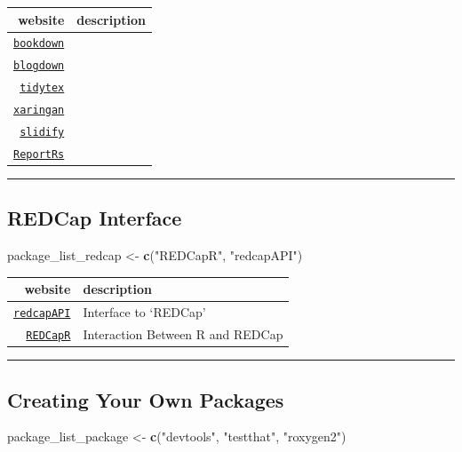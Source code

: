 \documentclass[]{book}
\newenvironment{Shaded}{\begin{snugshade}}{\end{snugshade}}
\newcommand{\KeywordTok}[1]{\textcolor[rgb]{0.13,0.29,0.53}{\textbf{#1}}}
\newcommand{\StringTok}[1]{\textcolor[rgb]{0.31,0.60,0.02}{#1}}
\newcommand{\NormalTok}[1]{#1}
\theoremstyle{definition}
\theoremstyle{definition}
\theoremstyle{definition}
\theoremstyle{remark}
\begin{document}
\begin{longtable}[]{@{}rl@{}}
\toprule
website & description\tabularnewline
\midrule
\endhead
\href{}{\texttt{bookdown}} &\tabularnewline
\href{}{\texttt{blogdown}} &\tabularnewline
\href{}{\texttt{tidytex}} &\tabularnewline
\href{}{\texttt{xaringan}} &\tabularnewline
\href{}{\texttt{slidify}} &\tabularnewline
\href{}{\texttt{ReportRs}} &\tabularnewline
\bottomrule
\end{longtable}

\begin{center}\rule{0.5\linewidth}{\linethickness}\end{center}

\subsection{REDCap Interface}\label{redcap-interface}

\begin{Shaded}
\begin{Highlighting}[]
\NormalTok{package_list_redcap <-}\StringTok{ }\KeywordTok{c}\NormalTok{(}\StringTok{"REDCapR"}\NormalTok{,}
                         \StringTok{"redcapAPI"}\NormalTok{)}
\end{Highlighting}
\end{Shaded}

\begin{longtable}[]{@{}rl@{}}
\toprule
website & description\tabularnewline
\midrule
\endhead
\href{https://github.com/nutterb/redcapAPI/wiki}{\texttt{redcapAPI}} &
Interface to `REDCap'\tabularnewline
\href{https://github.com/OuhscBbmc/REDCapR}{\texttt{REDCapR}} &
Interaction Between R and REDCap\tabularnewline
\bottomrule
\end{longtable}

\begin{center}\rule{0.5\linewidth}{\linethickness}\end{center}

\subsection{Creating Your Own
Packages}\label{creating-your-own-packages}

\begin{Shaded}
\begin{Highlighting}[]
\NormalTok{package_list_package <-}\StringTok{ }\KeywordTok{c}\NormalTok{(}\StringTok{"devtools"}\NormalTok{,}
                          \StringTok{"testthat"}\NormalTok{,}
                          \StringTok{"roxygen2"}\NormalTok{)}
\end{Highlighting}
\end{Shaded}
\end{document}
